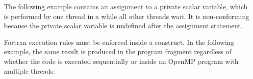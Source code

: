 \begin{fortranspecific}[4ex]

The following example contains an assignment to a private scalar variable, which 
is performed by one thread in a  while all other threads wait. 
It is non-conforming because the private scalar variable is undefined after the 
assignment statement. 


Fortran execution rules must be enforced inside a  construct. 
In the following example, the same result is produced in the program 
fragment regardless of whether the code is executed sequentially or inside an OpenMP 
program with multiple threads:

\end{fortranspecific}


